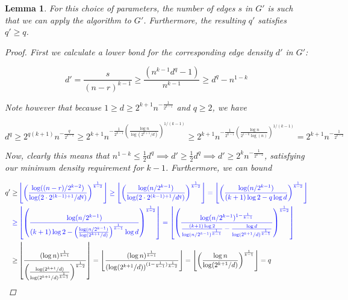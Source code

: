 \documentclass[12pt]{article}
\newtheorem{lemma}[thm]{Lemma}
\theoremstyle{remark}
\begin{document}
    \begin{lemma} \label{lemma:q_prime}
        For this choice of parameters, the number of edges $s$ in $G'$
        is such that we can apply the algorithm to $G'$.
        Furthermore, the resulting $q'$ satisfies $q' \geq q$.

        \begin{proof}

            First we calculate a lower bond for the corresponding edge density $d'$ in $G'$:

            \begin{equation*}
                d' = \frac{s}{(n-r)^{k-1}} \geq \frac{\left(  n^{k-1} d^{q} - 1\right)}{n^{k-1}}
                \geq d^q - n^{1-k}
            \end{equation*}

            Note however that because $1 \geq d \geq 2^{k+1} n^{-\frac{1}{2^{k-1}}}$ and $q \geq 2$, we have

            \[
                d^q \geq 2^{q(k+1)}n^{-\frac{q}{2^{k-1}}} \geq
                2^{k+1} n^{-\frac{1}{2^{k-1}} \left( \frac{\log n}{\log (2^{k+1}/d)} \right)^{1/(k-1)}}
                \geq 2^{k+1} n^{-\frac{1}{2^{k-1}} \left( \frac{\log n}{2^{1-k} \log (n)} \right)^{1/(k-1)}}
                = 2^{k+1}n^{-\frac{1}{2^{k-2}}}
            \]

            Now, clearly this means that $n^{1-k} \leq \frac{1}{2} d^q \implies d' \geq \frac{1}{2}d^q
            \implies d' \geq 2^{k}n^{-\frac{1}{2^{k-2}}}$,
            satisfying our minimum density requirement for $k-1$.
            Furthermore, we can bound


            \begin{align*}
                q' \geq &
                \color{blue} \left\lfloor \left(  \frac{\log ((n-r)/2^{k-2})}{\log (2 \cdot 2^{(k-1)+1}/d^q)} \right)^{\frac{1}{k-2}} \right\rfloor
                \geq \left\lfloor \left(  \frac{\log (n/2^{k-1})}{\log (2 \cdot 2^{(k-1)+1}/d^q)} \right)^{\frac{1}{k-2}} \right\rfloor =
                \left\lfloor \left(  \frac{\log (n / 2^{k-1})}{(k+1) \log 2 - q \log d} \right)^{\frac{1}{k-2}} \right\rfloor \\
                \color {blue}\geq &
                \color {blue} \left\lfloor \left(  \frac{\log (n / 2^{k-1})}{(k+1) \log 2 - \left(  \frac{\log (n / 2^{k-1})}{\log (2^{k+1}/d)} \right)^{\frac{1}{k-1}}  \log d} \right)^{\frac{1}{k-2}} \right\rfloor
                =
                \left\lfloor \left(  \frac{\log (n / 2^{k-1})^{1-\frac{1}{k-1}}}{\frac{(k+1) \log 2}{\log(n / 2^{k-1})^{\frac{1}{k-1}}} - \frac{\log d}{\log (2^{k+1}/d)^{\frac{1}{k-1}}} } \right)^{\frac{1}{k-2}} \right\rfloor \\
                \geq &
                \left\lfloor  \frac{(\log n)^{\frac{
                    1}{k-1}}}{\left(\frac{\log (2^{k+1}/d)}{\log (2^{k+1}/d)^{\frac{1}{k-1}}} \right)^{\frac{1}{k-2}} } \right\rfloor
                = \left\lfloor  \frac{(\log n)^{\frac{1}{k-1}}}{\left(\log (2^{k+1}/d)\right)^{(1-\frac{1}{k-1})\frac{1}{k-2}}} \right\rfloor
                = \left\lfloor \left(  \frac{\log n}{\log (2^{k+1}/d)} \right)^{\frac{1}{k-1}} \right\rfloor = q
            \end{align*}


\end{proof}
\end{lemma}
\end{document}
